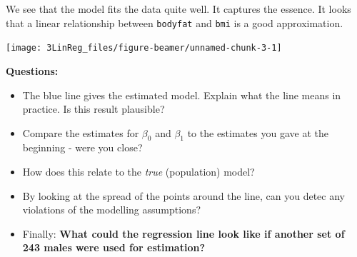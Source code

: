 \documentclass[10pt,ignorenonframetext,]{beamer}
\begin{document}
\begin{frame}[fragile]

We see that the model fits the data quite well. It captures the essence.
It looks that a linear relationship between \texttt{bodyfat} and
\texttt{bmi} is a good approximation.

\begin{center}\texttt{[image: 3LinReg\_files/figure-beamer/unnamed-chunk-3-1]} \end{center}

\end{frame}

\begin{frame}

\textbf{Questions:}

\begin{itemize}
\item
  The blue line gives the estimated model. Explain what the line means
  in practice. Is this result plausible?
\item
  Compare the estimates for \(\beta_0\) and \(\beta_1\) to the estimates
  you gave at the beginning - were you close?
\item
  How does this relate to the \emph{true} (population) model?
\item
  By looking at the spread of the points around the line, can you detec
  any violations of the modelling assumptions?
\item
  Finally: \textbf{What could the regression line look like if another
  set of 243 males were used for estimation?}
\end{itemize}

\end{frame}
\end{document}
